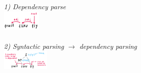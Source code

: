 \begin{multicols}{2}
\textit{1) Dependency parse}\\
\includegraphics[height=10mm]{inhalt/images/NLP/06_dependency_parsing_1.png}
\\\\
\textit{2) Syntactic parsing $\to$ dependency parsing}\\
\includegraphics[height=10mm]{inhalt/images/NLP/06_dependency_parsing_2.png}
\end{multicols}